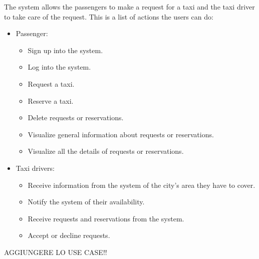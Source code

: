 The system allows the passengers to make a request for a taxi and the taxi driver to take care of the request.
This is a list of actions the users can do:

\begin{itemize}
    \item Passenger:
        \begin{itemize}
        	\item Sign up into the system.
        	\item Log into the system.
        	\item Request a taxi.
        	\item Reserve a taxi.
        	\item Delete requests or reservations.
        	\item Visualize general information about requests or reservations.
        	\item Visualize all the details of requests or reservations.
        \end{itemize}
    \item Taxi drivers:
        \begin{itemize}
        	\item Receive information from the system of the city's area they have to cover.
        	\item Notify the system of their availability.
        	\item Receive requests and reservations from the system.
        	\item Accept or decline requests.
        \end{itemize}
\end{itemize}

AGGIUNGERE LO USE CASE!!


